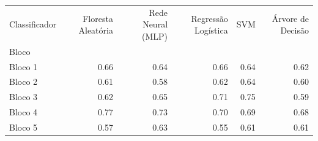 \begin{tabular}{lrrrrr}
\toprule
Classificador & Floresta Aleatória & Rede Neural (MLP) & Regressão Logística & SVM & Árvore de Decisão \\
Bloco &  &  &  &  &  \\
\midrule
Bloco 1 & 0.66 & 0.64 & 0.66 & 0.64 & 0.62 \\
Bloco 2 & 0.61 & 0.58 & 0.62 & 0.64 & 0.60 \\
Bloco 3 & 0.62 & 0.65 & 0.71 & 0.75 & 0.59 \\
Bloco 4 & 0.77 & 0.73 & 0.70 & 0.69 & 0.68 \\
Bloco 5 & 0.57 & 0.63 & 0.55 & 0.61 & 0.61 \\
\bottomrule
\end{tabular}
